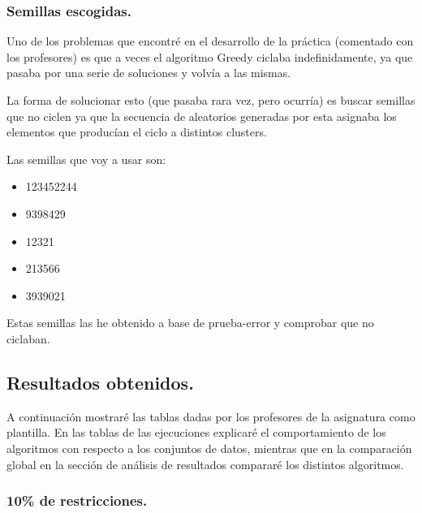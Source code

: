 \documentclass[12pt, spanish]{article}
\begin{document}
\subsubsection{Semillas escogidas.}

Uno de los problemas que encontré en el desarrollo de la práctica (comentado con los profesores) es que a veces el algoritmo Greedy ciclaba indefinidamente, ya que pasaba por una serie de soluciones y volvía a las mismas.

La forma de solucionar esto (que pasaba rara vez, pero ocurría) es buscar semillas que no ciclen ya que la secuencia de aleatorios generadas por esta asignaba los elementos que producían el ciclo a distintos clusters.

Las semillas que voy a usar son:

\begin{itemize}
	\item {123452244}
	\item {9398429}
	\item {12321}
	\item {213566}
	\item {3939021}
\end{itemize}

Estas semillas las he obtenido a base de prueba-error y comprobar que no ciclaban.

\newpage

\subsection{Resultados obtenidos.}

A continuación mostraré las tablas dadas por los profesores de la asignatura como plantilla. En las tablas de las ejecuciones explicaré el comportamiento de los algoritmos con respecto a los conjuntos de datos, mientras que en la comparación global en la sección de análisis de resultados compararé los distintos algoritmos.

\subsubsection{10\% de restricciones.}
\end{document}

